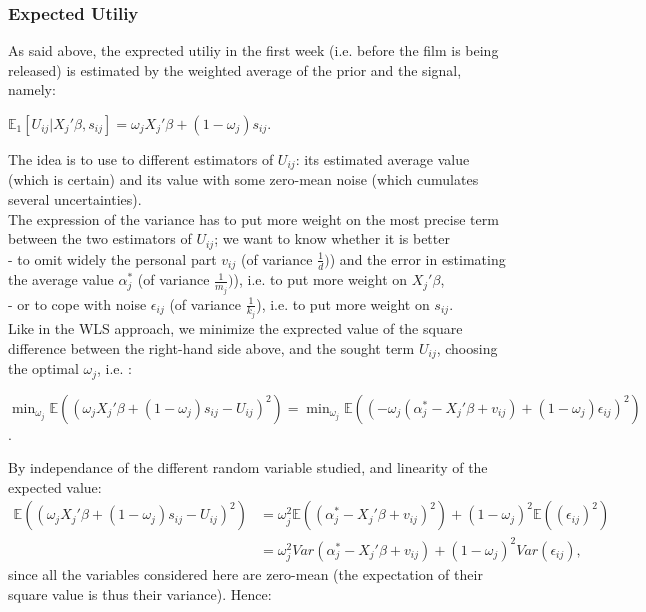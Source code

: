 	\subsubsection{Expected Utiliy}
	As said above, the exprected utiliy in the first week (i.e. before the film is being released) is estimated by the weighted average of the prior and the signal, namely:
	\begin{center}
		$\mathbb{E}_1[U_{i j}|X_{j}'\beta, s_{i j}]=\omega_{j} X_{j}'\beta+(1-\omega_{j})s_{i j}$.
	\end{center}
	The idea is to use to different estimators of $U_{i j}$: its estimated average value (which is certain) and its value with some zero-mean noise (which cumulates several uncertainties).\\
	The expression of the variance has to put more weight on the most precise term between the two estimators of $U_{i j}$; we want to know whether it is better \\
	- to omit widely the personal part $v_{i j}$ (of variance $\frac{1}{d})$) and the error in estimating the average value $\alpha_{j}^{*}$ (of variance $\frac{1}{m_{j}})$), i.e. to put more weight on $X_{j}'\beta$,\\
	- or to cope with noise $\epsilon_{i j}$ (of variance $\frac{1}{k_{j}}$), i.e. to put more weight on $s_{i j}$.\\
	Like in the WLS approach, we minimize the exprected value of the square difference between the right-hand side above, and the sought term $U_{i j}$, choosing the optimal $\omega_{j}$, i.e. :
	\begin{center}
		$\min_{\omega_{j}} \mathbb{E}((\omega_{j} X_{j}'\beta+(1-\omega_{j})s_{i j}-U_{i j})^{2})=\min_{\omega_{j}} \mathbb{E}((-\omega_{j} (\alpha_{j}^{*}-X_{j}'\beta+v_{i j})+(1-\omega_{j})\epsilon_{i j})^{2})$.
	\end{center}
	By independance of the different random variable studied, and linearity of the expected value:\\
	\begin{align*}
	\mathbb{E}((\omega_{j} X_{j}'\beta+(1-\omega_{j})s_{i j}-U_{i j})^2)&=\omega_{j}^{2}\mathbb{E}((\alpha_{j}^{*}-X_{j}'\beta+v_{i j})^{2})+(1-\omega_{j})^{2}\mathbb{E}((\epsilon_{i j})^{2})\\
	&=\omega_{j}^{2}Var(\alpha_{j}^{*}-X_{j}'\beta+v_{i j})+(1-\omega_{j})^{2}Var(\epsilon_{i j}),
	\end{align*}
	since all the variables considered here are zero-mean (the expectation of their square value is thus their variance). Hence:
